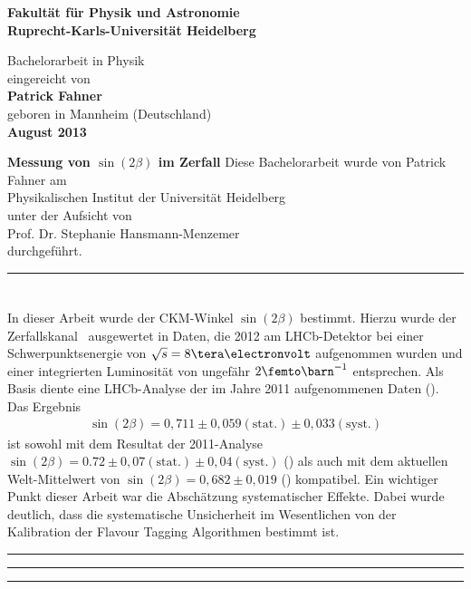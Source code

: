 \begin{titlepage}
\begin{center}
 
\Large\textbf{Fakultät für Physik und Astronomie\\
Ruprecht-Karls-Universität Heidelberg}

\vspace{15cm}

\normalsize
Bachelorarbeit in Physik\\
eingereicht von\\
\vspace{0.5cm}
\Large\textbf{Patrick Fahner}\\
\normalsize
\vspace{0.5cm}
geboren in Mannheim (Deutschland)\\
\vspace{0.5cm}
\Large\textbf{August 2013}

\newpage
\newpage

\normalsize
\boldmath
\Huge{\textbf{Messung von $\sin(2\beta)$ im Zerfall \Decaychannel}}
\unboldmath
\vfill
\normalsize
Diese Bachelorarbeit wurde von Patrick Fahner am\\
Physikalischen Institut der Universität Heidelberg\\
unter der Aufsicht von\\
Prof. Dr. Stephanie Hansmann-Menzemer \\
durchgeführt.
\end{center}
\end{titlepage}
\newpage
\hrule
\section*{\abstractname}
In dieser Arbeit wurde der CKM-Winkel $\sin(2\beta)$ bestimmt. Hierzu wurde der Zerfallskanal \Decaychannel\ ausgewertet in Daten, die 2012 am LHCb-Detektor bei einer Schwerpunktsenergie von $\sqrt{s}=8\tera\electronvolt$ aufgenommen wurden und einer integrierten Luminosität von ungefähr $2\femto\barn^{-1}$ entsprechen. Als Basis diente eine LHCb-Analyse der im Jahre 2011 aufgenommenen Daten (\cite{lhcb-paper}). Das Ergebnis 
\begin{align*}
\sin(2\beta) = 0,711 \pm 0,059(\text{stat.}) \pm 0,033(\text{syst.})
\end{align*}
ist sowohl mit dem Resultat der 2011-Analyse $\sin(2\beta) = 0.72 \pm 0,07 (\text{stat.}) \pm 0,04 (\text{syst.})$ (\cite{lhcb-paper}) als auch mit dem aktuellen Welt-Mittelwert von $\sin(2\beta) = 0,682 \pm 0,019$ (\cite{pdg-average}) kompatibel. Ein wichtiger Punkt dieser Arbeit war die Abschätzung systematischer Effekte. Dabei wurde deutlich, dass die systematische Unsicherheit im Wesentlichen von der Kalibration der Flavour Tagging Algorithmen bestimmt ist. \\
\hrule
\vfill
\hrule
{}
\hrule
